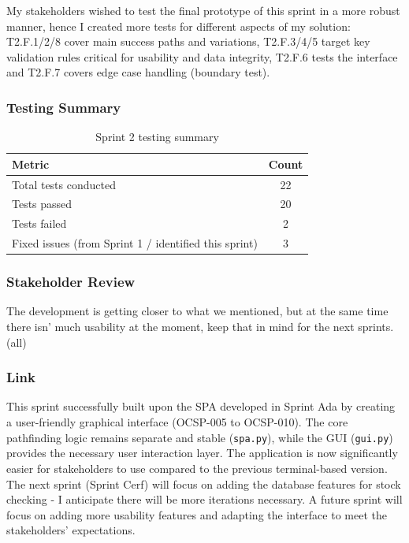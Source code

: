 My stakeholders wished to test the final prototype of this sprint in a more robust manner, hence I created more tests for different aspects of my solution: T2.F.1/2/8 cover main success paths and variations, T2.F.3/4/5 target key validation rules critical for usability and data integrity, T2.F.6 tests the interface and T2.F.7 covers edge case handling (boundary test).

\newpage

\subsubsection{Testing Summary}
\begin{table}[htbp]
	\centering
	\begin{tabular}{|l|c|}
		\hline
		\textbf{Metric} & \textbf{Count} \\
		\hline
		Total tests conducted & 22 \\ %
		\hline
		Tests passed & 20 \\ %
		\hline
		Tests failed & 2 \\ %
		\hline
		Fixed issues (from Sprint 1 / identified this sprint) & 3 \\ %
		\hline
	\end{tabular}
	\caption{Sprint 2 testing summary}
\end{table}

\subsubsection{Stakeholder Review}

The development is getting closer to what we mentioned, but at the same time there isn' much usability at the moment, keep that in mind for the next sprints. (all)

\subsubsection{Link}
This sprint successfully built upon the SPA developed in Sprint Ada by creating a user-friendly graphical interface (OCSP-005 to OCSP-010). The core pathfinding logic remains separate and stable (\verb|spa.py|), while the GUI (\verb|gui.py|) provides the necessary user interaction layer. The application is now significantly easier for stakeholders to use compared to the previous terminal-based version. The next sprint (Sprint Cerf) will focus on adding the database features for stock checking - I anticipate there will be more iterations necessary. A future sprint will focus on adding more usability features and adapting the interface to meet the stakeholders' expectations.

